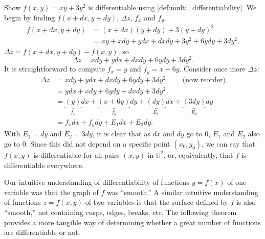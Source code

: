 \begin{example}\label{ex_totaldiff1}
Show $f(x,y) = xy+3y^2$ is differentiable using \autoref{def:multi_differentiability}.
\solution
We begin by finding $f(x+dx,y+dy)$, $\Delta z$, $f_x$ and $f_y$.
\begin{align*}
f(x+dx,y+dy) &= (x+dx)(y+dy) + 3(y+dy)^2 \\
						&= xy + xdy+ydx+dxdy + 3y^2+6ydy+3dy^2.
\end{align*}
$\Delta z = f(x+dx,y+dy) - f(x,y)$, so
\[\Delta z = xdy + ydx + dxdy + 6ydy+3dy^2.\]
It is straightforward to compute $f_x = y$ and $f_y = x+6y$. Consider once more $\Delta z$:
\begin{align*}
\Delta z &= xdy + ydx + dxdy + 6ydy+3dy^2 \qquad \text{ (now reorder)}\\
		&= ydx + xdy+6ydy+ dxdy + 3dy^2\\
		&= \underbrace{(y)}_{f_x}dx + \underbrace{(x+6y)}_{f_y}dy + \underbrace{(dy)}_{E_1}dx+\underbrace{(3dy)}_{E_2}dy\\
		&= f_xdx + f_ydy + E_1dx+E_2dy.
\end{align*}
With $E_1 = dy$ and $E_2 = 3dy$, it is clear that as $dx$ and $dy$ go to 0, $E_1$ and $E_2$ also go to 0. Since this did not depend on a specific point $(x_0,y_0)$, we can say that $f(x,y)$ is differentiable for all pairs $(x,y)$ in $\mathbb{R}^2$, or, equivalently, that $f$ is differentiable everywhere.
\end{example}

Our intuitive understanding of differentiability of functions $y=f(x)$ of one variable was that the graph of $f$ was ``smooth.'' A similar intuitive understanding of functions $z=f(x,y)$ of two variables is that the surface defined by $f$ is also ``smooth,'' not containing cusps, edges, breaks,  etc. The following theorem
provides a more tangible way of determining whether a great number of functions are differentiable or not.


